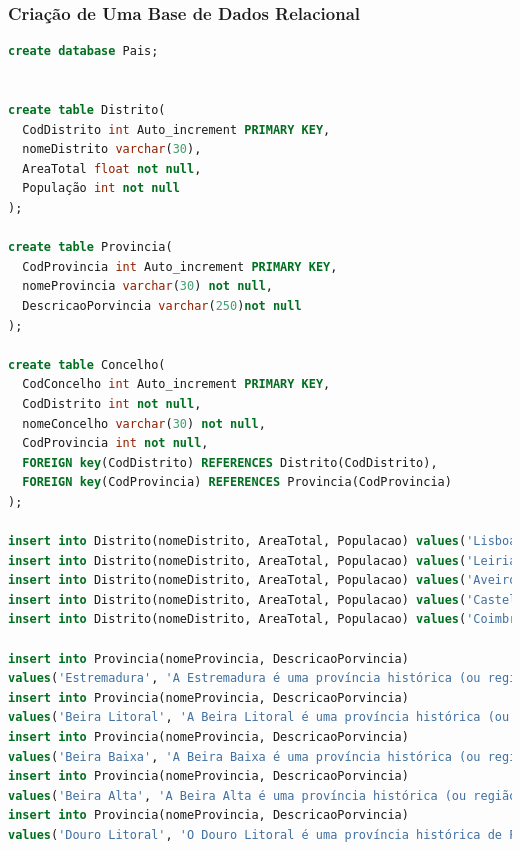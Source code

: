 \documentclass[14pt]{article}
\begin{document}
\subsubsection{Criação de Uma Base de Dados Relacional }

\begin{lstlisting}[language=SQL]
create database Pais;


create table Distrito(
  CodDistrito int Auto_increment PRIMARY KEY,
  nomeDistrito varchar(30),
  AreaTotal float not null,
  População int not null
);

create table Provincia(
  CodProvincia int Auto_increment PRIMARY KEY,
  nomeProvincia varchar(30) not null,
  DescricaoPorvincia varchar(250)not null
);

create table Concelho(
  CodConcelho int Auto_increment PRIMARY KEY,
  CodDistrito int not null,
  nomeConcelho varchar(30) not null,
  CodProvincia int not null,
  FOREIGN key(CodDistrito) REFERENCES Distrito(CodDistrito),
  FOREIGN key(CodProvincia) REFERENCES Provincia(CodProvincia)
);

insert into Distrito(nomeDistrito, AreaTotal, Populacao) values('Lisboa', 2761, 3079772);
insert into Distrito(nomeDistrito, AreaTotal, Populacao) values('Leiria', 3506, 470895);
insert into Distrito(nomeDistrito, AreaTotal, Populacao) values('Aveiro', 2798.54, 714200);
insert into Distrito(nomeDistrito, AreaTotal, Populacao) values('Castelo Branco', 6675, 196264);
insert into Distrito(nomeDistrito, AreaTotal, Populacao) values('Coimbra', 3947, 429987);

insert into Provincia(nomeProvincia, DescricaoPorvincia)
values('Estremadura', 'A Estremadura é uma província histórica (ou região natural) de Portugal, estabelecida na Idade Média e extinta no século XIX, devendo o seu nome derivar do latim Extrema Durii');
insert into Provincia(nomeProvincia, DescricaoPorvincia)
values('Beira Litoral', 'A Beira Litoral é uma província histórica (ou região natural) situada na região do Centro de Portugal, formalmente instituída por uma reforma administrativa havida em 1936.');
insert into Provincia(nomeProvincia, DescricaoPorvincia)
values('Beira Baixa', 'A Beira Baixa é uma província histórica (ou região natural) situada na região do Centro de Portugal, originalmente criada no século XIX a partir de parte do território da anterior Província da Beira.');
insert into Provincia(nomeProvincia, DescricaoPorvincia)
values('Beira Alta', 'A Beira Alta é uma província histórica (ou região natural) situada na região do Centro de Portugal. Foi criada, em 1832, por subdivisão da antiga província da Beira, passando a ser constituída pelas comarcas de Viseu, Lamego e Trancoso.');
insert into Provincia(nomeProvincia, DescricaoPorvincia)
values('Douro Litoral', 'O Douro Litoral é uma província histórica de Portugal, formalmente instituída por uma reforma administrativa havida em 1936.');


\end{lstlisting}
\end{document}

